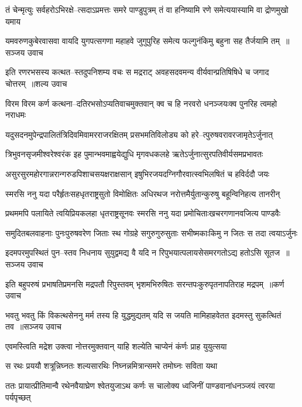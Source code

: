 \twolineshloka
{तं चेन्मृत्युः सर्वहरोऽभिरक्षे--त्सदाऽप्रमत्तः समरे पाण्डुपुत्रम्}
{तं वा हनिष्यामि रणे समेत्ययास्यामि वा द्रोणमुखो यमाय}


\threelineshloka
{यमवरुणकुबेरवासवा वायदि युगपत्सगणा महाहवे}
{जुगुपुरिह समेत्य फल्गुनंकिमु बहुना सह तैर्जयामि तम् ॥सञ्जय उवाच}
{}


\threelineshloka
{इति रणरभसस्य कत्थत--स्तदुपनिशम्य वचः स मद्रराट्}
{अवहसदवमन्य वीर्यवान्प्रतिषिषिधे च जगाद चोत्तरम् ॥शल्य उवाच}
{}


\twolineshloka
{विरम विरम कर्ण कत्थना--दतिरभसोऽप्यतिवाचमुक्तवान्}
{क्व च हि नरवरो धनञ्जयःक्व पुनरिह त्वमहो नराधमः}


\twolineshloka
{यदुसदनमुपेन्द्रपालितंत्रिदिवमिवामरराजरक्षितम्}
{प्रसभमतिविलोड्य को हरे--त्पुरुषवरावरजामृतेऽर्जुनात्}


\twolineshloka
{त्रिभुवनसृजमीश्वरेश्वरंक इह पुमान्भवमाह्वयेद्युधि}
{मृगवधकलहे ऋतेऽर्जुनात्सुरपतिवीर्यसमप्रभावतः}


\twolineshloka
{असुरसुरमहोरगान्नरान्गरुडपिशाचसयक्षराक्षसान्}
{इषुभिरजयदग्निगौरवात्स्वभिलषितं च हविर्ददौ जयः}


\twolineshloka
{स्मरसि ननु यदा परैर्हृतःसहधृतराष्ट्रसुतो विमोक्षितः}
{अधिरथज नरोत्तमैर्युतान्कुरुषु बहून्विनिहत्य तानरीन्}


\twolineshloka
{प्रथममपि पलायिते त्वयिप्रियकलहा धृतराष्ट्रसूनवः}
{स्मरसि ननु यदा प्रमोचिताःखचरगणानवजित्य पाण्डवैः}


\twolineshloka
{समुदितबलवाहनाः पुनःपुरुषवरेण जिताः स्थ गोग्रहे}
{सगुरुगुरुसुताः सभीष्मकाःकिमु न जितः स तदा त्वयाऽर्जुनः}


\threelineshloka
{इदमपरमुपस्थितं पुन--स्तव निधनाय सुयुद्वमद्य वै}
{यदि न रिपुभयात्पलायसेसमरगतोऽद्य हतोऽसि सूतज ॥सञ्जय उवाच}
{}


\threelineshloka
{इति बहुपरुषं प्रभाषतिप्रमनसि मद्रपतौ रिपुस्तवम्}
{भृशमभिरुषितः सरन्तपःकुरुपृतनापतिराह मद्रपम् ॥कर्ण उवाच}
{}


\threelineshloka
{भवतु भवतु किं विकत्थसेननु मर्म तस्य हि युद्धमुद्यतम्}
{यदि स जयति मामिहाहवेतत इदमस्तु सुकत्थितं तव ॥सञ्जय उवाच}
{}


\twolineshloka
{एवमस्त्विति मद्रेश उक्त्वा नोत्तरमुक्तवान्}
{याहि शल्येति चाप्येनं कंर्णः प्राह युयुत्सया}


\twolineshloka
{स रथः प्रययौ शत्रून्निघ्नतः शल्यसारथिः}
{निघ्नन्नमित्रान्समरे तमोघ्नः सविता यथा}


\twolineshloka
{ततः प्रायात्प्रीतिमान्वै रथेनवैयाघ्रेण श्वेतयुजाऽथ कर्णः}
{स चालोक्य ध्वजिनीं पाण्डवानांधनञ्जयं त्वरया पर्यपृच्छत्}



